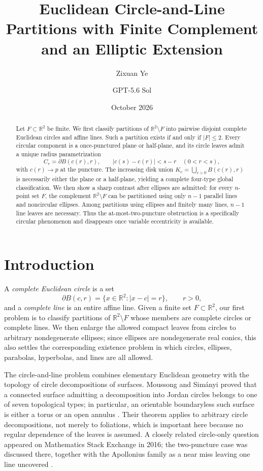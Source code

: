 \documentclass[11pt]{article}
\title{\textbf{Euclidean Circle-and-Line Partitions with Finite Complement and an Elliptic Extension}}
\author{Zixuan Ye \and GPT-5.6 Sol}
\date{October 2026}
\newcommand{\R}{\mathbb{R}}
\begin{document}
\maketitle

\begin{abstract}
Let $F\subset\R^2$ be finite. We first classify partitions of $\R^2\setminus F$ into pairwise disjoint complete Euclidean circles and affine lines. Such a partition exists if and only if $|F|\le2$. Every circular component is a once-punctured plane or half-plane, and its circle leaves admit a unique radius parametrization
\[
C_r=\partial B(c(r),r),\qquad |c(s)-c(r)|<s-r\quad(0<r<s),
\]
with $c(r)\to p$ at the puncture. The increasing disk union $K_c=\bigcup_{r>0}B(c(r),r)$ is necessarily either the plane or a half-plane, yielding a complete four-type global classification. We then show a sharp contrast after ellipses are admitted: for every $n$-point set $F$, the complement $\R^2\setminus F$ can be partitioned using only $n-1$ parallel lines and noncircular ellipses. Among partitions using ellipses and finitely many lines, $n-1$ line leaves are necessary. Thus the at-most-two-puncture obstruction is a specifically circular phenomenon and disappears once variable eccentricity is available.
\end{abstract}

\section{Introduction}

A \emph{complete Euclidean circle} is a set
\[
\partial B(c,r)=\{x\in\R^2:|x-c|=r\},\qquad r>0,
\]
and a \emph{complete line} is an entire affine line. Given a finite set $F\subset\R^2$, our first problem is to classify partitions of $\R^2\setminus F$ whose members are complete circles or complete lines. We then enlarge the allowed compact leaves from circles to arbitrary nondegenerate ellipses; since ellipses are nondegenerate real conics, this also settles the corresponding existence problem in which circles, ellipses, parabolas, hyperbolas, and lines are all allowed.

The circle-and-line problem combines elementary Euclidean geometry with the topology of circle decompositions of surfaces. Moussong and Sim\'anyi proved that a connected surface admitting a decomposition into Jordan circles belongs to one of seven topological types; in particular, an orientable boundaryless such surface is either a torus or an open annulus \cite{MoussongSimanyi}. Their theorem applies to arbitrary circle decompositions, not merely to foliations, which is important here because no regular dependence of the leaves is assumed. A closely related circle-only question appeared on Mathematics Stack Exchange in 2016; the two-puncture case was discussed there, together with the Apollonius family as a near miss leaving one line uncovered \cite{MSECirclePartition}.
\end{document}
